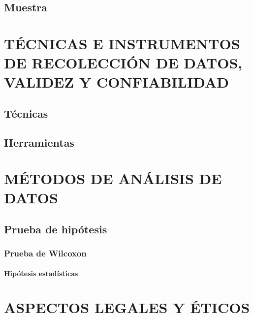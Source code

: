 \lipsum[3]

\subsection{Muestra}

\lipsum[4]


\section{TÉCNICAS E INSTRUMENTOS DE RECOLECCIÓN DE DATOS, VALIDEZ Y CONFIABILIDAD}

\subsection{Técnicas}

\lipsum[5]

\subsection{Herramientas}

\lipsum[6]


\section{MÉTODOS DE ANÁLISIS DE DATOS}

\lipsum[7]

\subsection{Prueba de hipótesis}

\lipsum[8]

\subsubsection{Prueba de Wilcoxon}

\lipsum[9]

\paragraph{Hipótesis estadísticas}

\lipsum[10]


\section{ASPECTOS LEGALES Y ÉTICOS}

\lipsum[11]
